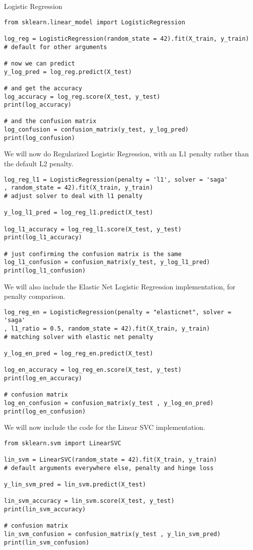 \documentclass[12pt, letterpaper]{article}
\begin{document}
Logistic Regression 

\begin{verbatim} 
from sklearn.linear_model import LogisticRegression 

log_reg = LogisticRegression(random_state = 42).fit(X_train, y_train) 
# default for other arguments 

# now we can predict 
y_log_pred = log_reg.predict(X_test)

# and get the accuracy 
log_accuracy = log_reg.score(X_test, y_test) 
print(log_accuracy) 

# and the confusion matrix 
log_confusion = confusion_matrix(y_test, y_log_pred) 
print(log_confusion) 
\end{verbatim} 

We will now do Regularized Logistic Regression, with an L1 penalty rather than the default L2 penalty.  

\begin{verbatim} 
log_reg_l1 = LogisticRegression(penalty = 'l1', solver = 'saga'
, random_state = 42).fit(X_train, y_train) 
# adjust solver to deal with l1 penalty

y_log_l1_pred = log_reg_l1.predict(X_test)

log_l1_accuracy = log_reg_l1.score(X_test, y_test) 
print(log_l1_accuracy) 

# just confirming the confusion matrix is the same 
log_l1_confusion = confusion_matrix(y_test, y_log_l1_pred)
print(log_l1_confusion)
\end{verbatim} 

We will also include the Elastic Net Logistic Regression implementation, for penalty comparison. 

\begin{verbatim} 
log_reg_en = LogisticRegression(penalty = "elasticnet", solver = 'saga'
, l1_ratio = 0.5, random_state = 42).fit(X_train, y_train) 
# matching solver with elastic net penalty 

y_log_en_pred = log_reg_en.predict(X_test) 

log_en_accuracy = log_reg_en.score(X_test, y_test) 
print(log_en_accuracy)

# confusion matrix 
log_en_confusion = confusion_matrix(y_test , y_log_en_pred)
print(log_en_confusion)
\end{verbatim} 

We will now include the code for the Linear SVC implementation. 

\begin{verbatim} 
from sklearn.svm import LinearSVC 

lin_svm = LinearSVC(random_state = 42).fit(X_train, y_train)
# default arguments everywhere else, penalty and hinge loss 

y_lin_svm_pred = lin_svm.predict(X_test) 

lin_svm_accuracy = lin_svm.score(X_test, y_test) 
print(lin_svm_accuracy)

# confusion matrix 
lin_svm_confusion = confusion_matrix(y_test , y_lin_svm_pred)
print(lin_svm_confusion)
\end{verbatim}
\end{document}
